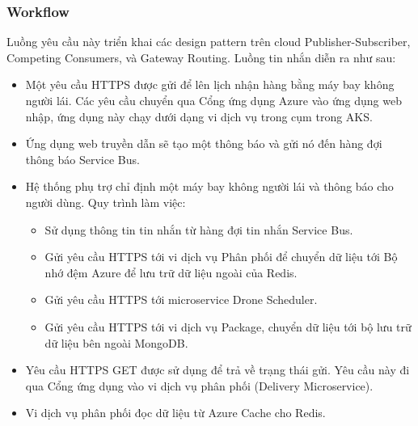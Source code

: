 \subsubsection{Workflow}
Luồng yêu cầu này triển khai các design pattern trên cloud Publisher-Subscriber, Competing Consumers, và Gateway Routing. Luồng tin nhắn diễn ra như sau:
    \begin{itemize}
        \item Một yêu cầu HTTPS được gửi để lên lịch nhận hàng bằng máy bay không người lái. Các yêu cầu chuyển qua Cổng ứng dụng Azure vào ứng dụng web nhập, ứng dụng này chạy dưới dạng vi dịch vụ trong cụm trong AKS.
        \item Ứng dụng web truyền dẫn sẽ tạo một thông báo và gửi nó đến hàng đợi thông báo Service Bus.
        \item Hệ thống phụ trợ chỉ định một máy bay không người lái và thông báo cho người dùng. Quy trình làm việc:
            \begin{itemize}
                \item Sử dụng thông tin tin nhắn từ hàng đợi tin nhắn Service Bus.
                \item Gửi yêu cầu HTTPS tới vi dịch vụ Phân phối để chuyển dữ liệu tới Bộ nhớ đệm Azure để lưu trữ dữ liệu ngoài của Redis.
                \item Gửi yêu cầu HTTPS tới microservice Drone Scheduler. 
                \item Gửi yêu cầu HTTPS tới vi dịch vụ Package, chuyển dữ liệu tới bộ lưu trữ dữ liệu bên ngoài MongoDB.
            \end{itemize} 
        \item Yêu cầu HTTPS GET được sử dụng để trả về trạng thái gửi. Yêu cầu này đi qua Cổng ứng dụng vào vi dịch vụ phân phối (Delivery Microservice).
        \item Vi dịch vụ phân phối đọc dữ liệu từ Azure Cache cho Redis.     
    \end{itemize}
